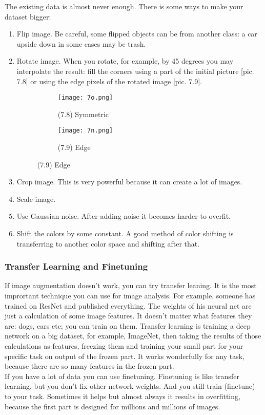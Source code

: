 The existing data is almost never enough. There is some ways to make your dataset bigger:\\
\begin{enumerate}[label=$\bullet$]
  \item Flip image. Be careful, some flipped objects can be from another class: a car upside down in some cases may be trash.
  \item Rotate image. When you rotate, for example, by 45 degrees you may interpolate the result: fill the corners using a part of the initial picture [pic. 7.8] or using the edge pixels of the rotated image [pic. 7.9].\\
  \begin{figure}[h]
  \centering
  \begin{subfigure}[l]{0.2\linewidth}
    \texttt{[image: 7o.png]}
    \caption*{(7.8) Symmetric}
  \end{subfigure}
  \hspace{2cm}
  \begin{subfigure}[r]{0.2\linewidth}
    \texttt{[image: 7n.png]}
    \caption*{(7.9) Edge}
  \end{subfigure}
\end{figure}
  \item Crop image. This is very powerful because it can create a lot of images.
  \item Scale image.
  \item Use Gaussian noise. After adding noise it becomes harder to overfit.
  \item Shift the colors by some constant. A good method of color shifting is transferring to another color space and shifting after that.
\end{enumerate}

\subsubsection*{Transfer Learning and Finetuning}

If image augmentation doesn't work, you can try transfer leaning. It is the most imprortant technique you can use for image analysis. For example, someone has trained on ResNet and published everything. The weights of his neural net are just a calculation of some image features. It doesn't matter what features they are: dogs, cars etc; you can train on them. Transfer learning is training a deep network on a big dataset, for example, ImageNet, then taking the results of those calculations as features, freezing them and training your small part for your specific task on output of the frozen part. It works wonderfully for any task, because there are so many features in the frozen part.\\
If you have a lot of data you can use finetuning. Finetuning is like transfer learning, but you don't fix other network weights. And you still train (finetune) to your task. Sometimes it helps but almost always it results in overfitting, because the first part is designed for millions and millions of images.